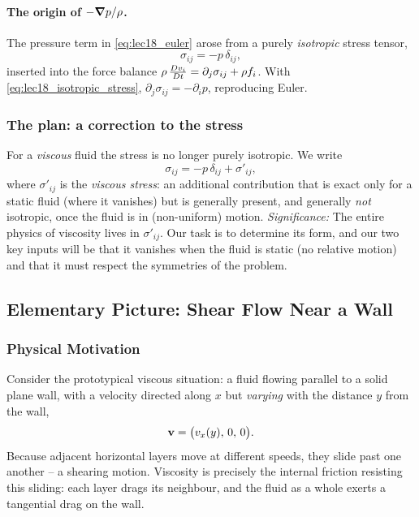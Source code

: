 \documentclass[../main.tex]{subfiles}
\begin{document}
\paragraph{The origin of $-\grad p/\rho$.} The pressure term in \eqref{eq:lec18_euler} arose from a purely \emph{isotropic} stress tensor,
\begin{equation}
  \sigma_{ij} = -p\,\delta_{ij},
  \label{eq:lec18_isotropic_stress}
\end{equation}
inserted into the force balance $\rho\,\frac{Dv_i}{Dt}=\partial_j\sigma_{ij}+\rho f_i$. With \eqref{eq:lec18_isotropic_stress}, $\partial_j\sigma_{ij}=-\partial_i p$, reproducing Euler.

\subsubsection*{The plan: a correction to the stress}
For a \emph{viscous} fluid the stress is no longer purely isotropic. We write
\begin{equation}
  \boxed{\sigma_{ij} = -p\,\delta_{ij} + \sigma'_{ij},}
  \label{eq:lec18_stress_split}
\end{equation}
where $\sigma'_{ij}$ is the \emph{viscous stress}: an additional contribution that is exact only for a static fluid (where it vanishes) but is generally present, and generally \emph{not} isotropic, once the fluid is in (non-uniform) motion.
\textit{Significance:} The entire physics of viscosity lives in $\sigma'_{ij}$. Our task is to determine its form, and our two key inputs will be that it vanishes when the fluid is static (no relative motion) and that it must respect the symmetries of the problem.

\subsection{Elementary Picture: Shear Flow Near a Wall}\label{sec:lec18:elementary}

\subsubsection*{Physical Motivation}
Consider the prototypical viscous situation: a fluid flowing parallel to a solid plane wall, with a velocity directed along $x$ but \emph{varying} with the distance $y$ from the wall,
\begin{equation}
  \mathbf{v} = \big(v_x(y),\,0,\,0\big).
  \label{eq:lec18_shear_field}
\end{equation}
Because adjacent horizontal layers move at different speeds, they slide past one another -- a shearing motion. Viscosity is precisely the internal friction resisting this sliding: each layer drags its neighbour, and the fluid as a whole exerts a tangential drag on the wall.
\end{document}
